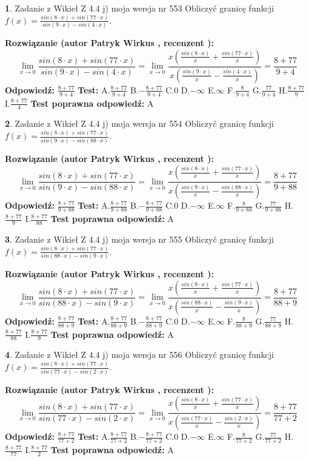 \documentclass[12pt, a4paper]{article}
\theoremstyle{definition} %
\newtheorem{zad}{}
\newcommand{\zadStart}[1]{\begin{zad}#1\newline}
\newcommand{\zadStop}{\end{zad}}
\newcommand{\rozwStart}[2]{\noindent \textbf{Rozwiązanie (autor #1 , recenzent #2): }\newline}
\newcommand{\rozwStop}{\newline}
\newcommand{\odpStart}{\noindent \textbf{Odpowiedź:}\newline}
\newcommand{\odpStop}{\newline}
\newcommand{\testStart}{\noindent \textbf{Test:}\newline}
\newcommand{\testStop}{\newline}
\newcommand{\kluczStart}{\noindent \textbf{Test poprawna odpowiedź:}\newline}
\newcommand{\kluczStop}{\newline}
\begin{document}
\zadStart{Zadanie z Wikieł Z 4.4 j) moja wersja nr 553}
Obliczyć granicę funkcji $f(x)=\frac{sin(8\cdot x) +sin(77\cdot x)}{sin(9\cdot x) -sin(4\cdot x)}$.
\zadStop
\rozwStart{Patryk Wirkus}{}
$$\lim\limits_{x\to 0}\frac{sin(8\cdot x) +sin(77\cdot x)}{sin(9\cdot x) -sin(4\cdot x)}=\lim\limits_{x\to 0}\frac{x(\frac{sin(8\cdot x)}{x}+\frac{sin(77\cdot x)}{x})}{x(\frac{sin(9\cdot x)}{x}-\frac{sin(4\cdot x)}{x})}=\frac{8+77}{9+4}$$
\rozwStop
\odpStart
$\frac{8+77}{9+4}$
\odpStop
\testStart
A.$\frac{8+77}{9+4}$
B.$-\frac{8+77}{9+4}$
C.$0$
D.$-\infty$
E.$\infty$
F.$\frac{8}{9+4}$
G.$\frac{77}{9+4}$
H.$\frac{8+77}{9}$
I.$\frac{8+77}{4}$
\testStop
\kluczStart
A
\kluczStop



\zadStart{Zadanie z Wikieł Z 4.4 j) moja wersja nr 554}
Obliczyć granicę funkcji $f(x)=\frac{sin(8\cdot x) +sin(77\cdot x)}{sin(9\cdot x) -sin(88\cdot x)}$.
\zadStop
\rozwStart{Patryk Wirkus}{}
$$\lim\limits_{x\to 0}\frac{sin(8\cdot x) +sin(77\cdot x)}{sin(9\cdot x) -sin(88\cdot x)}=\lim\limits_{x\to 0}\frac{x(\frac{sin(8\cdot x)}{x}+\frac{sin(77\cdot x)}{x})}{x(\frac{sin(9\cdot x)}{x}-\frac{sin(88\cdot x)}{x})}=\frac{8+77}{9+88}$$
\rozwStop
\odpStart
$\frac{8+77}{9+88}$
\odpStop
\testStart
A.$\frac{8+77}{9+88}$
B.$-\frac{8+77}{9+88}$
C.$0$
D.$-\infty$
E.$\infty$
F.$\frac{8}{9+88}$
G.$\frac{77}{9+88}$
H.$\frac{8+77}{9}$
I.$\frac{8+77}{88}$
\testStop
\kluczStart
A
\kluczStop



\zadStart{Zadanie z Wikieł Z 4.4 j) moja wersja nr 555}
Obliczyć granicę funkcji $f(x)=\frac{sin(8\cdot x) +sin(77\cdot x)}{sin(88\cdot x) -sin(9\cdot x)}$.
\zadStop
\rozwStart{Patryk Wirkus}{}
$$\lim\limits_{x\to 0}\frac{sin(8\cdot x) +sin(77\cdot x)}{sin(88\cdot x) -sin(9\cdot x)}=\lim\limits_{x\to 0}\frac{x(\frac{sin(8\cdot x)}{x}+\frac{sin(77\cdot x)}{x})}{x(\frac{sin(88\cdot x)}{x}-\frac{sin(9\cdot x)}{x})}=\frac{8+77}{88+9}$$
\rozwStop
\odpStart
$\frac{8+77}{88+9}$
\odpStop
\testStart
A.$\frac{8+77}{88+9}$
B.$-\frac{8+77}{88+9}$
C.$0$
D.$-\infty$
E.$\infty$
F.$\frac{8}{88+9}$
G.$\frac{77}{88+9}$
H.$\frac{8+77}{88}$
I.$\frac{8+77}{9}$
\testStop
\kluczStart
A
\kluczStop



\zadStart{Zadanie z Wikieł Z 4.4 j) moja wersja nr 556}
Obliczyć granicę funkcji $f(x)=\frac{sin(8\cdot x) +sin(77\cdot x)}{sin(77\cdot x) -sin(2\cdot x)}$.
\zadStop
\rozwStart{Patryk Wirkus}{}
$$\lim\limits_{x\to 0}\frac{sin(8\cdot x) +sin(77\cdot x)}{sin(77\cdot x) -sin(2\cdot x)}=\lim\limits_{x\to 0}\frac{x(\frac{sin(8\cdot x)}{x}+\frac{sin(77\cdot x)}{x})}{x(\frac{sin(77\cdot x)}{x}-\frac{sin(2\cdot x)}{x})}=\frac{8+77}{77+2}$$
\rozwStop
\odpStart
$\frac{8+77}{77+2}$
\odpStop
\testStart
A.$\frac{8+77}{77+2}$
B.$-\frac{8+77}{77+2}$
C.$0$
D.$-\infty$
E.$\infty$
F.$\frac{8}{77+2}$
G.$\frac{77}{77+2}$
H.$\frac{8+77}{77}$
I.$\frac{8+77}{2}$
\testStop
\kluczStart
A
\kluczStop
\end{document}
